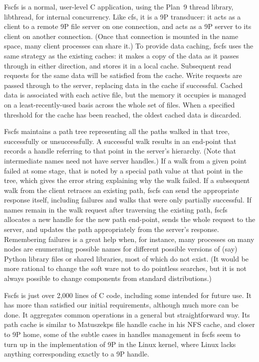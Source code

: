 Fscfs is a normal, user-level C application, using the Plan~9 thread
library, libthread, for internal 
concurrency. Like cfs, it is a 9P transducer: it acts as a client to a 
remote 9P file server on one connection, and acts as a 9P server to its 
client on another connection. (Once that connection is mounted in the name 
space, many client processes can share it.) To provide data caching, fscfs 
uses the same strategy as the existing caches: it makes a copy of the data
as it passes through in either direction, and stores it in a local cache. 
Subsequent read requests for the same data will be satisfied from the cache. 
Write requests are passed through to the server, replacing data in the 
cache if successful. Cached data is associated with each active file, but the 
memory it occupies is managed on a least-recently-used basis across the 
whole set of files. When a specified threshold for the cache has been reached, 
the oldest cached data is discarded.

Fscfs maintains a path tree representing all the paths walked in that tree, 
successfully or 
unsuccessfully. A successful walk results in an end-point that records a
handle referring to that point in the server's hierarchy. (Note that 
intermediate names need not have server handles.) If a walk from a
given point failed at some stage, that is noted by a special path value at 
that point in the tree, which gives the error string explaining why the walk 
failed. If a subsequent walk from the client retraces an existing path, 
fscfs can send the appropriate response itself, including failures and walks 
that were only partially successful. If names remain in the walk request 
after traversing the existing path, fscfs allocates a new handle for the new 
path end-point, sends the whole request to the server, and updates the path 
appropriately from the server's response. Remembering failures is a
great help when, for instance, many processes on many nodes are enumerating 
possible names for different possible versions of (say) Python library 
files or shared libraries, most of which do not exist. (It would be more 
rational to change the soft ware not to do pointless searches, but it is not 
always possible to change components from standard distributions.)

Fscfs is just over 2,000 lines of C code, including some intended for future 
use. It has more than satisfied our initial requirements, although much more 
can be done. It aggregates common operations in a general but straightforward 
way. Its path cache is similar to Matuszekps file handle cache in his NFS cache,
and closer to 9P home, some of the subtle cases in handles management in 
fscfs seem to turn up in the implementation of 9P in the Linux kernel, 
where Linux lacks anything corresponding exactly to a 9P handle.

